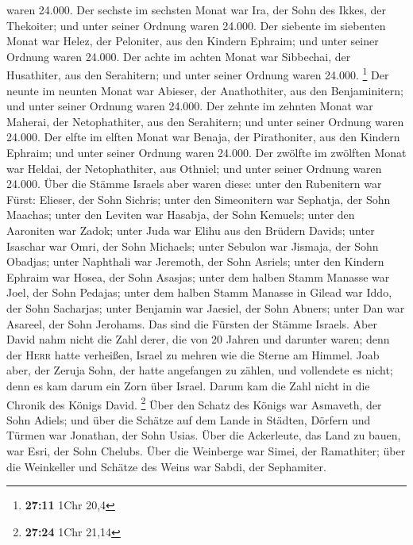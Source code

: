 waren 24.000.  Der sechste im sechsten Monat war Ira, der
Sohn des Ikkes, der Thekoiter; und unter seiner Ordnung waren 24.000.
 Der siebente im siebenten Monat war Helez, der
Peloniter, aus den Kindern Ephraim; und unter seiner Ordnung waren
24.000.  Der achte im achten Monat war Sibbechai, der
Husathiter, aus den Serahitern; und unter seiner Ordnung waren 24.000.
\footnote{\textbf{27:11} 1Chr 20,4}  Der neunte im
neunten Monat war Abieser, der Anathothiter, aus den Benjaminitern; und
unter seiner Ordnung waren 24.000.  Der zehnte im zehnten
Monat war Maherai, der Netophathiter, aus den Serahitern; und unter
seiner Ordnung waren 24.000.  Der elfte im elften Monat
war Benaja, der Pirathoniter, aus den Kindern Ephraim; und unter seiner
Ordnung waren 24.000.  Der zwölfte im zwölften Monat war
Heldai, der Netophathiter, aus Othniel; und unter seiner Ordnung waren
24.000.  Über die Stämme Israels aber waren diese: unter
den Rubenitern war Fürst: Elieser, der Sohn Sichris; unter den
Simeonitern war Sephatja, der Sohn Maachas;  unter den
Leviten war Hasabja, der Sohn Kemuels; unter den Aaroniten war Zadok;
 unter Juda war Elihu aus den Brüdern Davids; unter
Isaschar war Omri, der Sohn Michaels;  unter Sebulon war
Jismaja, der Sohn Obadjas; unter Naphthali war Jeremoth, der Sohn
Asriels;  unter den Kindern Ephraim war Hosea, der Sohn
Asasjas; unter dem halben Stamm Manasse war Joel, der Sohn Pedajas;
 unter dem halben Stamm Manasse in Gilead war Iddo, der
Sohn Sacharjas; unter Benjamin war Jaesiel, der Sohn Abners;
 unter Dan war Asareel, der Sohn Jerohams. Das sind die
Fürsten der Stämme Israels.  Aber David nahm nicht die
Zahl derer, die von 20 Jahren und darunter waren; denn der \textsc{Herr}
hatte verheißen, Israel zu mehren wie die Sterne am Himmel.
 Joab aber, der Zeruja Sohn, der hatte angefangen zu
zählen, und vollendete es nicht; denn es kam darum ein Zorn über Israel.
Darum kam die Zahl nicht in die Chronik des Königs David. \footnote{\textbf{27:24}
  1Chr 21,14}  Über den Schatz des Königs war Asmaveth,
der Sohn Adiels; und über die Schätze auf dem Lande in Städten, Dörfern
und Türmen war Jonathan, der Sohn Usias.  Über die
Ackerleute, das Land zu bauen, war Esri, der Sohn Chelubs.
 Über die Weinberge war Simei, der Ramathiter; über die
Weinkeller und Schätze des Weins war Sabdi, der Sephamiter.
